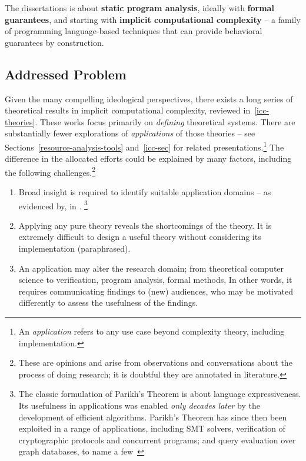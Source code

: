 \begin{center}
\begin{mdframed}[backgroundcolor=conceptbase,linecolor=concept,nobreak=true]
The dissertations is about \textbf{static program analysis}, ideally with
\textbf{formal guarantees}, and starting with \textbf{implicit computational
complexity} -- a family of programming language-based techniques that can
provide behavioral guarantees by construction.
\end{mdframed}
\end{center}

\subsection{Addressed Problem}
\label{subsec:problem}

Given the many compelling ideological perspectives, there exists a long series
of theoretical results in implicit computational complexity, reviewed
in~\autoref{icc-theories}. These works focus primarily on \emph{defining}
theoretical systems. There are substantially fewer explorations of
\emph{applications} of those theories -- see
Sections~\ref{resource-analysis-tools} and~\ref{icc-sec} for related
presentations.\footnote{An \emph{application} refers to any use case beyond
complexity theory, including implementation.} The difference in the allocated
efforts could be explained by many factors, including the following
challenges.\footnote{These are opinions and arise from observations and
conversations about the process of doing research; it is doubtful they are
annotated in literature.}

\begin{enumerate}

\item Broad insight is required to identify suitable application domains -- as
      evidenced by, \eg {} in .%
      \footnote{The classic formulation of Parikh's Theorem is about language
      expressiveness. Its usefulness in applications was enabled \emph{only
      decades later} by the development of efficient algorithms. Parikh's
      Theorem has since then been exploited in a range of applications,
      including SMT solvers, verification of cryptographic protocols and
      concurrent programs; and query evaluation over graph databases, to name a
      few~\cite[pg. 2]{hague2024}}

\item Applying any pure theory reveals the shortcomings of the theory.
      It is extremely difficult to design a useful theory without considering
      its implementation (paraphrased).

\item An application may alter the research domain; \eg from theoretical
      computer science to verification, program analysis, formal methods, \etc
      In other words, it requires communicating findings to (new) audiences, who
      may be motivated differently to assess the usefulness of the findings.

\end{enumerate}

